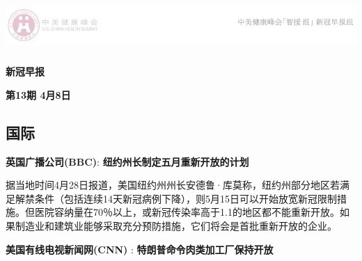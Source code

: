 \documentclass[]{article}
\author{}
\date{\vspace{-2.5em}}
\begin{document}
\fontsize{14}{14}
\selectfont
\vspace{-10truemm}

\newcommand{\resheading}[1]{%
  \noindent\fcolorbox{lavenderblush}{lavenderblush}{\makebox[\dimexpr\textwidth-2\fboxsep-2\fboxrule][l]{\textbf{~#1}}}%
}

\begin{center}
\includegraphics[height=2cm]{./input/logo2.png} 
\end{center}

\vspace{-5truemm}

\begin{center}
\fontsize{40}{40}
\textcolor{glaucous}{\textbf{新冠早报}}
\end{center}

\begin{center}
\fontsize{20}{20}
{\textcolor{glaucous}{\textbf{第13期 \space 4月8日}}}
\end{center}

%
  \noindent{}%

\vspace{-5mm}

\hypertarget{section}{%
\subsection{\texorpdfstring{\textcolor{glaucous}{\Large 国际}}{}}\label{section}}

\vspace{-3mm}

\textbf{\textcolor{glaucous}{英国广播公司(BBC)}}:
\textbf{纽约州长制定五月重新开放的计划 }

据当地时间4月28日报道，美国纽约州州长安德鲁·库莫称，纽约州部分地区若满足解禁条件（包括连续14天新冠病例下降），则5月15日可以开始放宽新冠限制措施。但医院容纳量在70％以上，或新冠传染率高于1.1的地区都不能重新开放。如果制造业和建筑业能够采取充分预防措施，它们将会是首批重新开放的企业。

\textbf{\textcolor{glaucous}{美国有线电视新闻网(CNN)}} :
\textbf{特朗普命令肉类加工厂保持开放}
\end{document}
